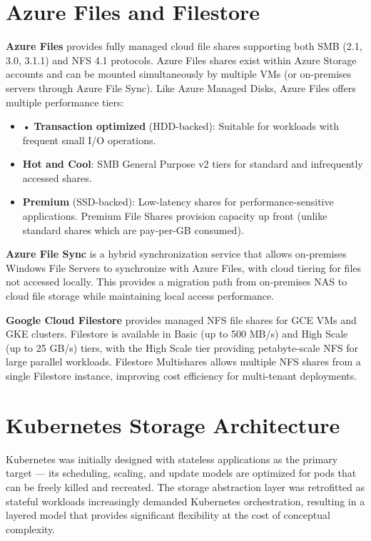 \section{Azure Files and Filestore}
\textbf{Azure Files} provides fully managed cloud file shares supporting both SMB (2.1, 3.0, 3.1.1) and NFS 4.1 protocols. Azure Files shares exist within Azure Storage accounts and can be mounted simultaneously by multiple VMs (or on-premises servers through Azure File Sync). Like Azure Managed Disks, Azure Files offers multiple performance tiers:

\begin{itemize}
  \item • \textbf{Transaction optimized} (HDD-backed): Suitable for workloads with frequent small I/O operations.
  \item \textbf{Hot and Cool}: SMB General Purpose v2 tiers for standard and infrequently accessed shares.
  \item \textbf{Premium} (SSD-backed): Low-latency shares for performance-sensitive applications. Premium File Shares provision capacity up front (unlike standard shares which are pay-per-GB consumed).
\end{itemize}

\textbf{Azure File Sync} is a hybrid synchronization service that allows on-premises Windows File Servers to synchronize with Azure Files, with cloud tiering for files not accessed locally. This provides a migration path from on-premises NAS to cloud file storage while maintaining local access performance.

\textbf{Google Cloud Filestore} provides managed NFS file shares for GCE VMs and GKE clusters. Filestore is available in Basic (up to 500 MB/s) and High Scale (up to 25 GB/s) tiers, with the High Scale tier providing petabyte-scale NFS for large parallel workloads. Filestore Multishares allows multiple NFS shares from a single Filestore instance, improving cost efficiency for multi-tenant deployments.

\section{Kubernetes Storage Architecture}
Kubernetes was initially designed with stateless applications as the primary target --- its scheduling, scaling, and update models are optimized for pods that can be freely killed and recreated. The storage abstraction layer was retrofitted as stateful workloads increasingly demanded Kubernetes orchestration, resulting in a layered model that provides significant flexibility at the cost of conceptual complexity.

